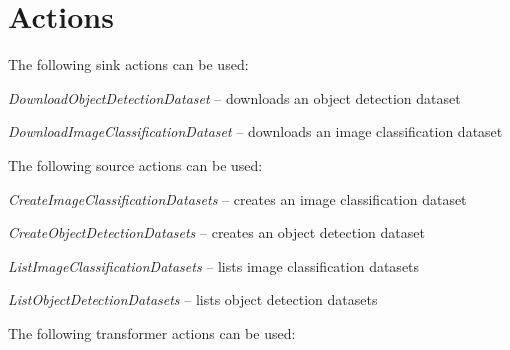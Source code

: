 \documentclass[a4paper]{book}
\begin{document}
\section{Actions}
The following sink actions can be used:
\begin{tight_itemize}
  \item \textit{DownloadObjectDetectionDataset} -- downloads an object detection dataset
  \item \textit{DownloadImageClassificationDataset} -- downloads an image classification dataset
\end{tight_itemize}
The following source actions can be used:
\begin{tight_itemize}
  \item \textit{CreateImageClassificationDatasets} -- creates an image classification dataset
  \item \textit{CreateObjectDetectionDatasets} -- creates an object detection dataset
  \item \textit{ListImageClassificationDatasets} -- lists image classification datasets
  \item \textit{ListObjectDetectionDatasets} -- lists object detection datasets
\end{tight_itemize}
The following transformer actions can be used:
\end{document}
